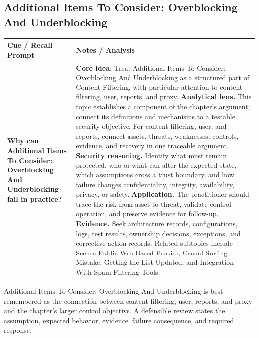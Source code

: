 \documentclass[11pt]{article}
\newcommand{\CornellHeader}{%
\rowcolor{Navy}\color{white}\bfseries Cue / Recall Prompt & \color{white}\bfseries Notes / Analysis\\\hline}
\newcommand{\CornellRow}[2]{%
\cellcolor{CueGray}\RaggedRight\textbf{#1} & \RaggedRight #2\\\hline}
\begin{document}
\subsection*{Additional Items To Consider: Overblocking And Underblocking}
\begin{longtable}{>{\RaggedRight\arraybackslash}p{}|>{\RaggedRight\arraybackslash}p{}}
\CornellHeader
\CornellRow{Why can Additional Items To Consider: Overblocking And Underblocking fail in practice?}{\textbf{Core idea.} Treat Additional Items To Consider: Overblocking And Underblocking as a structured part of Content Filtering, with particular attention to content-filtering, user, reports, and proxy. \textbf{Analytical lens.} This topic establishes a component of the chapter's argument; connect its definitions and mechanisms to a testable security objective. For content-filtering, user, and reports, connect assets, threats, weaknesses, controls, evidence, and recovery in one traceable argument. \textbf{Security reasoning.} Identify what must remain protected, who or what can alter the expected state, which assumptions cross a trust boundary, and how failure changes confidentiality, integrity, availability, privacy, or safety. \textbf{Application.} The practitioner should trace the risk from asset to threat, validate control operation, and preserve evidence for follow-up. \textbf{Evidence.} Seek architecture records, configurations, logs, test results, ownership decisions, exceptions, and corrective-action records. Related subtopics include Secure Public Web-Based Proxies, Casual Surfing Mistake, Getting the List Updated, and Integration With Spam-Filtering Tools.}
\end{longtable}
\begin{topicsummary}
Additional Items To Consider: Overblocking And Underblocking is best remembered as the connection between content-filtering, user, reports, and proxy and the chapter's larger control objective. A defensible review states the assumption, expected behavior, evidence, failure consequence, and required response.
\end{topicsummary}
\end{document}
